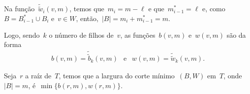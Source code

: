 \begin{itemize}
	Na função~$\tilde{\tilde{w}}_{i}(v,m)$, 
	temos que~${m_i = m-\ell}$ e que~${m_{i-1}^* = \ell}$
	e, como~${B = B_{i-1}^* \cup B_i}$ e~${v\in W}$, 
	então,~${|B| = m_i + m_{i-1}^*= m}$.

	\bigskip

	Logo, sendo~$k$ o número de filhos de~$v$,
	as funções~$b(v,m)$ e~$w(v,m)$ são da forma
	\begin{align*}
		b(v,m) = \tilde{\tilde{b}}_k(v,m)\ \ \text{ e }\ \
		w(v,m) = \tilde{\tilde{w}}_k(v,m). \nonumber
	\end{align*}

	Seja~$r$ a raíz de~$T$, temos que
	a largura do corte mínimo~$(B,W)$ em~$T$, onde~${|B|=m}$, 
	é~$\min\{b(r,m), w(r,m)\}$.
\end{itemize}